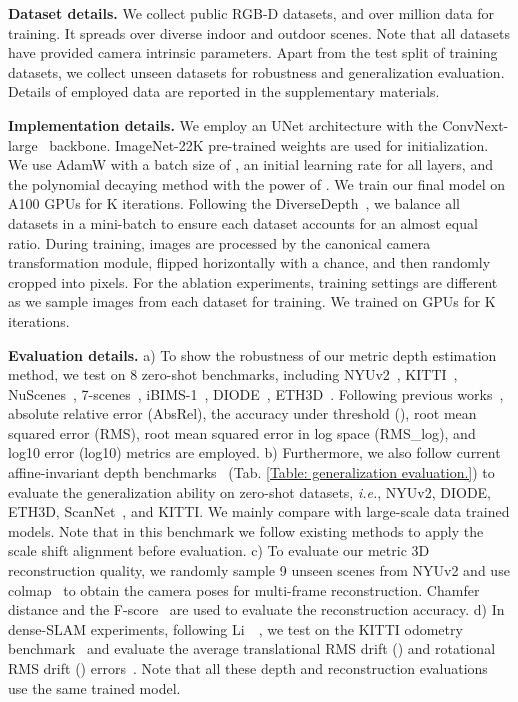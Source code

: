 
\noindent\textbf{Dataset details.}
\label{sec:data}
We collect  public RGB-D datasets, and over  million data for training. It spreads over diverse indoor and outdoor scenes. Note that all datasets have provided camera intrinsic parameters. Apart from the test split of training datasets, we collect  unseen datasets for robustness and generalization evaluation. Details of employed data are reported in the supplementary materials.  



\noindent\textbf{Implementation details.}
We employ an UNet architecture with the ConvNext-large~\cite{liu2022convnet} backbone. ImageNet-22K pre-trained weights are used for initialization. We use AdamW with a batch size of , an initial learning rate  for all layers, and the polynomial decaying method with the power of . We train our final model on  A100 GPUs for K iterations. Following the DiverseDepth~\cite{yin2021virtual}, we balance all datasets in a mini-batch to ensure each dataset accounts for an almost equal ratio. During training, images are processed by the canonical camera transformation module, flipped horizontally with a  chance, and then randomly cropped into 
 pixels. For the ablation experiments, training settings are different as we sample  images from each dataset for training. We trained on  GPUs for K iterations.










\noindent\textbf{Evaluation details.}
a) To show the robustness of our metric depth estimation 
method, we test on 8 zero-shot benchmarks, including NYUv2~\cite{silberman2012indoor}, KITTI~\cite{Geiger2013IJRR}, NuScenes~\cite{caesar2020nuscenes}, 7-scenes~\cite{shotton2013scene}, iBIMS-1~\cite{koch2018evaluation}, DIODE~\cite{vasiljevic2019diode}, ETH3D~\cite{schops2017multi}. Following previous works~\cite{yuan2022new}, absolute relative error (AbsRel),  the accuracy under threshold (), root mean squared error (RMS), root mean squared error in log space (RMS\_{log}), and log10 error (log10) metrics are employed. 
b) Furthermore, we also follow current affine-invariant depth benchmarks~\cite{leres, zhang2022hierarchical} (Tab. \ref{Table: generalization evaluation.}) to evaluate the generalization ability on  zero-shot datasets, \textit{i.e.},  NYUv2, DIODE, ETH3D, ScanNet~\cite{dai2017scannet}, and KITTI. We mainly compare with large-scale data trained models. Note that in this benchmark we follow existing methods to apply the scale shift alignment before evaluation. 
c) To evaluate our metric 3D reconstruction quality, we randomly sample 9 unseen scenes from NYUv2 and use colmap~\cite{schoenberger2016mvs} to obtain the camera poses for multi-frame reconstruction. Chamfer  distance and the F-score~\cite{knapitsch2017tanks} are used to evaluate the reconstruction accuracy. 
d) In dense-SLAM experiments, following Li~\etal~\cite{li2021generalizing}, we test on the KITTI odometry benchmark~\cite{Geiger2013IJRR} and evaluate the average translational RMS drift () and rotational RMS drift () errors~\cite{Geiger2013IJRR}.
Note that all these depth and reconstruction evaluations use the same trained model. 

